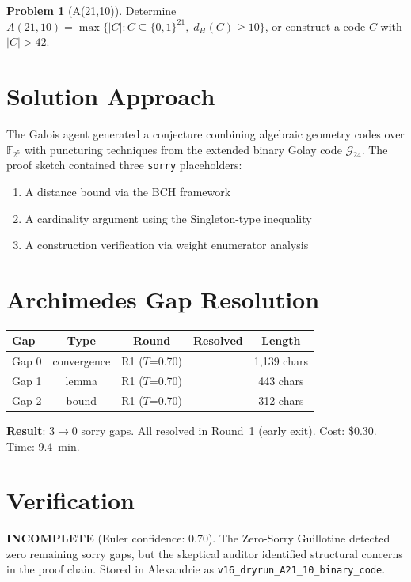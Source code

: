 \documentclass[12pt,a4paper]{report}
\theoremstyle{plain}
\theoremstyle{definition}
\newtheorem{problem}[theorem]{Problem}
\theoremstyle{remark}
\newcommand{\sorry}{\textcolor{sorryred}{\texttt{sorry}}}
\newcommand{\verdict}[1]{\textbf{\textcolor{inkblue}{#1}}}
\newcommand{\gapresolved}{\textcolor{verdgreen}{\checkmark}}
\begin{document}
\begin{problem}[A(21,10)]
Determine $A(21,10) = \max\{|C| : C \subseteq \{0,1\}^{21},\; d_H(C) \geq 10\}$,
or construct a code $C$ with $|C| > 42$.
\end{problem}

\section{Solution Approach}

The Galois agent generated a conjecture combining algebraic geometry codes over
$\mathbb{F}_{2^5}$ with puncturing techniques from the extended binary Golay code
$\mathcal{G}_{24}$. The proof sketch contained three \sorry{} placeholders:
\begin{enumerate}
  \item A distance bound via the BCH framework
  \item A cardinality argument using the Singleton-type inequality
  \item A construction verification via weight enumerator analysis
\end{enumerate}

\section{Archimedes Gap Resolution}

\begin{tabular}{lcccc}
\toprule
\textbf{Gap} & \textbf{Type} & \textbf{Round} & \textbf{Resolved} & \textbf{Length} \\
\midrule
Gap 0 & convergence & R1 ($T$=0.70) & \gapresolved & 1,139 chars \\
Gap 1 & lemma & R1 ($T$=0.70) & \gapresolved & 443 chars \\
Gap 2 & bound & R1 ($T$=0.70) & \gapresolved & 312 chars \\
\bottomrule
\end{tabular}

\medskip
\noindent\textbf{Result}: $3 \to 0$ sorry gaps. All resolved in Round~1 (early exit).
Cost: \$0.30. Time: 9.4~min.

\section{Verification}

\verdict{INCOMPLETE} (Euler confidence: 0.70). The Zero-Sorry Guillotine detected
zero remaining sorry gaps, but the skeptical auditor identified structural concerns
in the proof chain. Stored in Alexandrie as \texttt{v16\_dryrun\_A21\_10\_binary\_code}.
\end{document}
